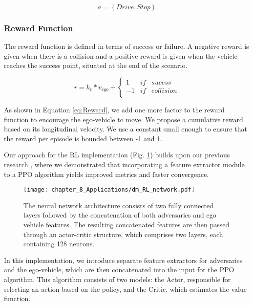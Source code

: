 \begin{equation}
	a=(Drive, Stop)    
	\label{eq:action}
\end{equation}

\subsubsection{Reward Function}
The reward function is defined in terms of success or failure. A negative reward is given when there is a collision and a positive reward is given when the vehicle reaches the success point, situated at the end of the scenario.

\begin{equation}
	r = k_v * v_{ego} + \left\lbrace\begin{array}{lcc}
		1 & if & sucess \\ 
		-1 & if & collision \\
	\end{array}\right.
	\label{eq:Reward}
\end{equation}

As shown in Equation \ref{eq:Reward}, we add one more factor to the reward function to encourage the ego-vehicle to move. We propose a cumulative reward based on its longitudinal velocity. We use a constant small enough to ensure that the reward per episode is bounded between -1 and 1.

Our approach for the RL implementation (Fig. \ref{fig:chapter_8_Applications/dm_RL_network}) builds upon our previous research \cite{Gutierrez2022}, where we demonstrated that incorporating a feature extractor module to a PPO algorithm yields improved metrics and faster convergence. 

\begin{figure}[h]
	\centering
	\texttt{[image: chapter\_8\_Applications/dm\_RL\_network.pdf]}
	\caption{The neural network architecture consists of two fully connected layers followed by the concatenation of both adversaries and ego vehicle features. The resulting concatenated features are then passed through an actor-critic structure, which comprises two layers, each containing 128 neurons.}	
	\label{fig:chapter_8_Applications/dm_RL_network}
\end{figure}

In this implementation, we introduce separate feature extractors for adversaries and the ego-vehicle, which are then concatenated into the input for the PPO algorithm. This algorithm consists of two models: the Actor, responsible for selecting an action based on the policy, and the Critic, which estimates the value function.

